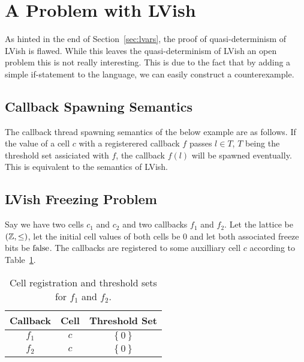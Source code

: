 
\section{A Problem with LVish}%
\label{sec:a_problem_of_lvish}

As hinted in the end of Section~\ref{sec:lvars}, the proof of quasi-determinism
of LVish is flawed. While this leaves the quasi-determinism of LVish an open
problem this is not really interesting. This is due to the fact that by adding a
simple if-statement to the language, we can easily construct a counterexample.

\subsection{Callback Spawning Semantics}%
\label{sub:callback_spawning_semantics_lvish}

The callback thread spawning semantics of the below example are as follows. If
the value of a cell $c$ with a registerered callback $f$ passes $l \in T$, $T$
being the threshold set assiciated with $f$, the callback $f(l)$ will be spawned
eventually. This is equivalent to the semantics of LVish.


\subsection{LVish Freezing Problem}%
\label{sub:lvish_freezing_problem}

Say we have two cells $c_1$ and $c_2$ and two callbacks $f_1$ and $f_2$. Let the
lattice be $(\mathbb{Z}, \leq)$, let the initial cell values of both cells be 
$0$ and let both associated freeze bits be $\mathrm{false}$. The
callbacks are registered to some auxilliary cell $c$ according to
Table~\ref{tab:cellreg}.

\begin{table}
  \centering
  \begin{tabular}{c|c|c}
    Callback & Cell & Threshold Set \\
    \hline
    $f_1$ & $c$ & $\left\{ 0 \right\}$ \\
    $f_2$ & $c$ & $\left\{ 0 \right\}$ \\
  \end{tabular}
  \caption{Cell registration and threshold sets for $f_1$ and $f_2$.}
  \label{tab:cellreg}
\end{table}

